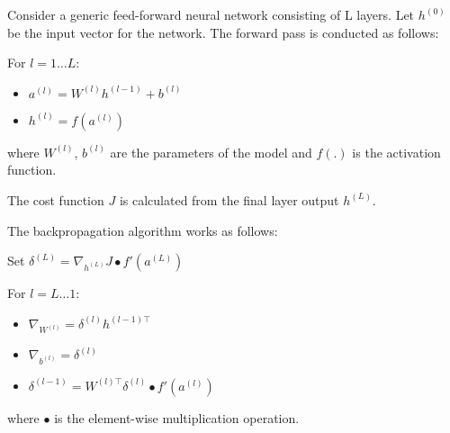 \documentclass[11pt,letterpaper]{article}
\newcommand{\up}[1]{^{(#1)}}
\begin{document}
Consider a generic feed-forward neural network consisting of L layers. Let $h\up{0}$ be the input vector for the network. The forward pass is conducted as follows:

For $l = 1 \dots L$:
\begin{itemize}
\item $a\up{l} = W\up{l}h\up{l - 1} + b\up{l}$ 
\item $h\up{l} = f(a\up{l})$
\end{itemize} where $W\up{l}$, $b\up{l}$ are the parameters of the model and $f(.)$ is the activation function.

The cost function $J$ is calculated from the final layer output $h\up{L}$. 

The backpropagation algorithm works as follows:

Set $\delta\up{L} = \nabla_{h\up{L}} J \bullet f'(a\up{L}) $

For $l = L \dots 1$:
\begin{itemize}
  \item $\nabla_{W\up{l}} = \delta\up{l} h^{(l - 1)\top} $
  \item $\nabla_{b\up{l}} = \delta\up{l}$
  \item $\delta\up{l - 1} = W^{(l)\top} \delta\up{l} \bullet f'(a\up{l})$
\end{itemize} where $\bullet$ is the element-wise multiplication operation.
\end{document}
